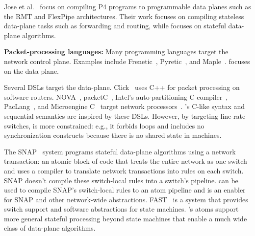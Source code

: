 Jose et al.~\cite{lavanya_compiler} focus on compiling P4 programs to
programmable data planes such as the RMT and FlexPipe architectures. Their work
focuses on compiling stateless data-plane tasks such as forwarding and routing,
while \pktlanguage focuses on stateful data-plane algorithms.

\textbf{Packet-processing languages:}
Many programming languages target the network control plane. Examples include
Frenetic~\cite{frenetic}, Pyretic~\cite{pyretic}, and Maple~\cite{maple}.
\pktlanguage focuses on the data plane.

Several DSLs target the data-plane. Click~\cite{click} uses C++ for packet
processing on software routers. NOVA~\cite{nova}, packetC~\cite{packetc},
Intel's auto-partitioning C compiler~\cite{intel_uiuc_pldi},
PacLang~\cite{paclang_lang, paclang_partitioner}, and Microengine
C~\cite{microenginec, intel_ixa} target network processors~\cite{ixp2800,
ixp4xx}. \pktlanguage's C-like syntax and sequential semantics are inspired by
these DSLs. However, by targeting line-rate switches, \pktlanguage is more
constrained: e.g., it forbids loops and includes no synchronization constructs
because there is no shared state in \absmachine machines.

The SNAP~\cite{snap} system programs stateful data-plane algorithms using a
network transaction: an atomic block of code that treats the entire network as
one switch~\cite{onebigswitch} and uses a compiler to translate network
transactions into rules on each switch. SNAP doesn't compile these switch-local
rules into a switch's pipeline. \pktlanguage can be used to compile SNAP's
switch-local rules to an atom pipeline and is an enabler for SNAP and other
network-wide abstractions. FAST~\cite{fast} is a system that provides switch
support and software abstractions for state machines. \absmachine's atoms
support more general stateful processing beyond state machines that enable
a much wide class of data-plane algorithms.
